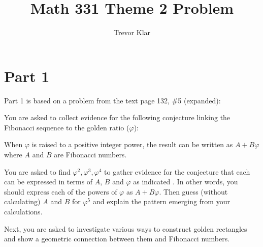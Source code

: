 \documentclass[letterpaper, 12pt]{article}
\title{Math 331 \linebreak
Theme 2 Problem}
\author{Trevor Klar}
\begin{document}
\maketitle

%

\section*{Part 1}
Part 1 is based on a problem from the text page 132, \#5 (expanded):

You are asked to collect evidence for the following conjecture linking the Fibonacci sequence to the golden ratio ($φ$):

\begin{conjecture*}
When $φ$ is raised to a positive integer power, the result can be written as $A + Bφ$ where $A$ and $B$ are Fibonacci numbers.
\end{conjecture*}


You are asked to find $φ^2, φ^3, φ^4$ to gather evidence for the conjecture that each can be expressed in terms of $A$, $B$ and $φ$ as indicated . In other words, you should express each of the powers of $φ$ as $A + Bφ$. Then guess (without calculating) $A$ and $B$ for $φ^5$ and explain the pattern emerging from your calculations.

Next, you are asked to investigate various ways to construct golden rectangles and show a geometric connection between them and Fibonacci numbers.
\end{document}
